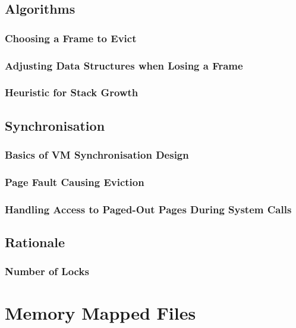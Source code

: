 \documentclass{article}
\renewcommand{\_}{\char`_}
\begin{document}
\subsection{Algorithms}

\subsubsection{Choosing a Frame to Evict}

\subsubsection{Adjusting Data Structures when Losing a Frame}

\subsubsection{Heuristic for Stack Growth}

\subsection{Synchronisation}

\subsubsection{Basics of VM Synchronisation Design}

\subsubsection{Page Fault Causing Eviction}

\subsubsection{Handling Access to Paged-Out Pages During System Calls}

\subsection{Rationale}

\subsubsection{Number of Locks}

\section{Memory Mapped Files}
\end{document}
